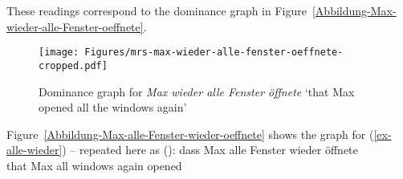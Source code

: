 \noindent
These readings correspond to the dominance graph in Figure~\vref{Abbildung-Max-wieder-alle-Fenster-oeffnete}.
\begin{figure}[htb]
\centering

\texttt{[image: Figures/mrs-max-wieder-alle-fenster-oeffnete-cropped.pdf]}
\caption{Dominance graph for \emph{Max wieder alle Fenster öffnete} `that Max opened all the
  windows again'\label{Abbildung-Max-wieder-alle-Fenster-oeffnete}}
\end{figure}%
Figure~\vref{Abbildung-Max-alle-Fenster-wieder-oeffnete} shows the graph for (\ref{ex-alle-wieder})
-- repeated here as ():
\ea
\label{ex-alle-wieder-zwei}
\gll dass Max alle Fenster wieder öffnete\\
	 that Max all windows again opened\\
\z
